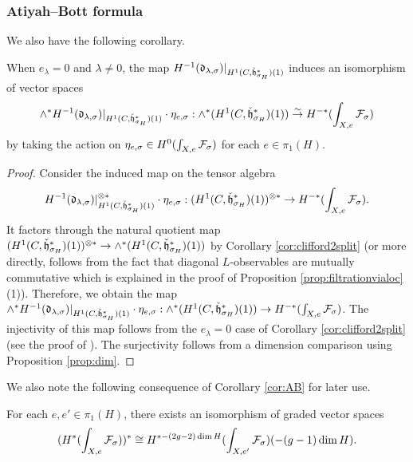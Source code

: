 \documentclass[reqno]{amsart}
\numberwithin{equation}{section}
\numberwithin{equation}{section}
\begin{document}
\subsubsection{Atiyah--Bott formula}
We also have the following corollary.
\begin{cor}\label{cor:AB}
    When $e_{\lambda}=0$ and $\lambda\neq 0$, the map $H^{-1}(\mathfrak{d}_{\lambda,\sigma})|_{H^1(C,\check{\mathfrak{h}}^*_{\sigma_H})(1)}$ induces an isomorphism of vector spaces \[\wedge^*H^{-1}(\mathfrak{d}_{\lambda,\sigma})|_{H^1(C,\check{\mathfrak{h}}^*_{\sigma_H})(1)}\cdot \eta_{e,\sigma}: \wedge^{*}(H^1(C,\check{\mathfrak{h}}_{\sigma_H}^*)(1))\stackrel{\sim}{\to} H^{-*}(\int_{X,e}\mathcal{F}_{\sigma})\] by taking the action on $\eta_{e,\sigma}\in H^0(\int_{X,e}\mathcal{F}_{\sigma})$ for each $e\in \pi_1(H)$.
\end{cor}
\begin{proof}
    Consider the induced map on the tensor algebra \[H^{-1}(\mathfrak{d}_{\lambda,\sigma})|_{H^1(C,\check{\mathfrak{h}}^*_{\sigma_H})(1)}^{\otimes *}\cdot \eta_{e,\sigma}: (H^1(C,\check{\mathfrak{h}}_{\sigma_H}^*)(1))^{\otimes *}\to H^{-*}(\int_{X,e}\mathcal{F}_{\sigma}).\] It factors through the natural quotient map $(H^1(C,\check{\mathfrak{h}}_{\sigma_H}^*)(1))^{\otimes *}\to \wedge^*(H^1(C,\check{\mathfrak{h}}_{\sigma_H}^*)(1))$ by Corollary \ref{cor:clifford2split} (or more directly, follows from the fact that diagonal $L$-observables are mutually commutative which is explained in the proof of Proposition \ref{prop:filtrationvialoc}(1)). Therefore, we obtain the map $\wedge^*H^{-1}(\mathfrak{d}_{\lambda,\sigma})|_{H^1(C,\check{\mathfrak{h}}^*_{\sigma_H})(1)}\cdot \eta_{e,\sigma}: \wedge^{*}(H^1(C,\check{\mathfrak{h}}_{\sigma_H}^*)(1))\to H^{-*}(\int_{X,e}\mathcal{F}_{\sigma})$. The injectivity of this map follows from the $e_{\lambda}=0$ case of Corollary \ref{cor:clifford2split} (see the proof of \cite[Lemma\,6.16]{wang2025specialcycleshtukascategorical}). The surjectivity follows from a dimension comparison using Proposition \ref{prop:dim}.
\end{proof}

We also note the following consequence of Corollary \ref{cor:AB} for later use.
\begin{cor}\label{cor:duality}
    For each $e, e'\in \pi_1(H)$, there exists an isomorphism of graded vector spaces \[(H^*(\int_{X,e}\mathcal{F}_{\sigma}))^*\cong H^{*-(2g-2)\dim H}(\int_{X,e'}\mathcal{F}_{\sigma})(-(g-1)\dim H) .\]
\end{cor}
\end{document}
